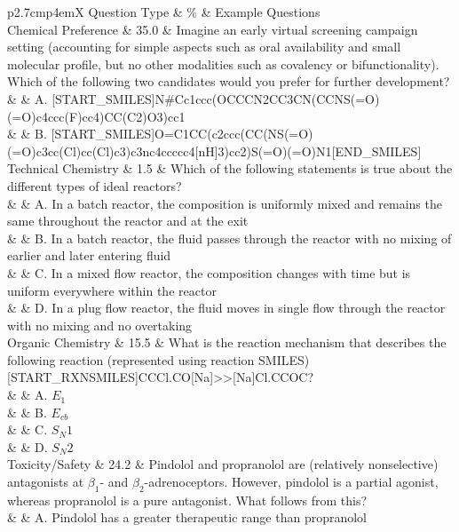 \begin{xltabular}{\textwidth}{p{2.7cm}p{4em}X}
        \toprule
        Question Type & \% & Example Questions  \\
        \midrule
        Chemical Preference & 35.0 & Imagine an early virtual screening campaign setting (accounting for simple aspects such as oral availability and small molecular profile, but no other modalities such as covalency or bifunctionality). Which of the following two candidates would you prefer for further development? \\
        & & A. [START\_SMILES]N\#Cc1ccc(OCCCN2CC3CN\-(CCNS(=O)(=O)c4ccc(F)cc4)CC(C2)O3)cc1 \\
        & & B. [START\_SMILES]O=C1CC(c2ccc(CC(NS(=O)\-(=O)\-c3cc(Cl)cc(Cl)c3)c3nc4ccccc4[nH]3)cc2)S\-(=O)\-(=O)N1[END\_SMILES] \\
        \midrule
        Technical Chemistry & 1.5 & Which of the following statements is true about the different types of ideal reactors? \\
        & & A. In a batch reactor, the composition is uniformly mixed and remains the same throughout the reactor and at the exit \\
        & & B. In a batch reactor, the fluid passes through the reactor with no mixing of earlier and later entering fluid \\
        & & C. In a mixed flow reactor, the composition changes with time but is uniform everywhere within the reactor \\
        & & D. In a plug flow reactor, the fluid moves in single flow through the reactor with no mixing and no overtaking \\
        \midrule
        Organic Chemistry & 15.5 & What is the reaction mechanism that describes the following reaction (represented using reaction SMILES) [START\_RXNSMILES]CCCl.CO[Na]>>[Na]Cl.CCOC? \\
        & & A. $E_1$ \\
        & & B. $E_{cb}$ \\
        & & C. $S_N1$ \\
        & & D. $S_N2$ \\
        \midrule
        Toxicity/Safety & 24.2 & Pindolol and propranolol are (relatively nonselective) antagonists at $\beta_1$- and $\beta_2$-adrenoceptors. However, pindolol is a partial agonist, whereas propranolol is a pure antagonist. What follows from this? \\
        & & A. Pindolol has a greater therapeutic range than propranolol \\

\end{xltabular}
